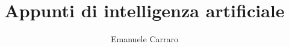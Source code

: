 \author{Emanuele Carraro}

\title{Appunti di intelligenza artificiale}
\maketitle

\newpage
\tableofcontents
